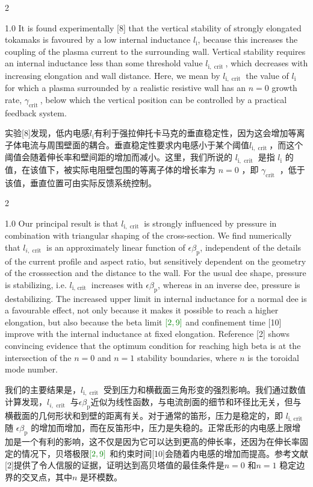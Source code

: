 \documentclass[utf8]{ctexart}
\newcommand\enzhbox[2]{
  	\quad\par \begin{paracol}{2} \colseprulecolor{black} 
  		\begin{spacing}{1.0}
  			\footnotesize  #1
  		\end{spacing}
  		\switchcolumn[1] 
  		#2
  	\end{paracol} \quad\par
  }
\begin{document}
\begin{sloppypar}
 
\enzhbox{  It is found experimentally \textcolor{green!50!black}{[8]} that the vertical stability of strongly elongated tokamaks is favoured by a low internal inductance $l_{\mathrm{i}}$, because this increases the coupling of the plasma current to the surrounding wall. Vertical stability requires an internal inductance less than some threshold value $l_{\mathrm{i}, \text { crit }}$, which decreases with increasing elongation and wall distance. Here, we mean by $l_{\mathrm{i}, \text { crit }}$ the value of $l_{\mathrm{i}}$ for which a plasma surrounded by a realistic resistive wall has an $n=0$ growth rate, $\gamma_{\text {crit }}$, below which the vertical position can be controlled by a practical feedback system.}{
实验\textcolor{green!50!black}{[8]}发现，低内电感$l_{\mathrm{i}}$有利于强拉伸托卡马克的垂直稳定性，因为这会增加等离子体电流与周围壁面的耦合。垂直稳定性要求内电感小于某个阈值$l_{\mathrm{i}, \text { crit }}$，而这个阈值会随着伸长率和壁间距的增加而减小。这里，我们所说的 $l_{\mathrm{i}, \text { crit }}$ 是指 $l_{\mathrm{i}}$ 的值，在该值下，被实际电阻壁包围的等离子体的增长率为 $n=0$  ，即 $\gamma_{\text {crit }}$ ，低于该值，垂直位置可由实际反馈系统控制。}
  
  
 
\enzhbox{  Our principal result is that $l_{\mathrm{i}, \text { crit }}$ is strongly influenced by pressure in combination with triangular shaping of the cross-section. We find numerically that $l_{i, \text { crit }}$ is an approximately linear function of $\epsilon \beta_{\mathrm{p}}$, independent of the details of the current profile and aspect ratio, but sensitively dependent on the geometry of the crosssection and the distance to the wall. For the usual dee shape, pressure is stabilizing, i.e. $l_{\mathrm{i} \text {, crit }}$ increases with $\epsilon \beta_{\mathrm{p}}$, whereas in an inverse dee, pressure is destabilizing. The increased upper limit in internal inductance for a normal dee is a favourable effect, not only because it makes it possible to reach a higher elongation, but also because the beta limit $\textcolor{green!50!black}{[2,9]}$ and confinement time \textcolor{green!50!black}{[10]} improve with the internal inductance at fixed elongation. Reference \textcolor{green!50!black}{[2]} shows convincing evidence that the optimum condition for reaching high beta is at the intersection of the $n=0$ and $n=1$ stability boundaries, where $n$ is the toroidal mode number.}{
我们的主要结果是，$l_{\mathrm{i}, \text { crit }}$  受到压力和横截面三角形变的强烈影响。我们通过数值计算发现，$l_{i, \text { crit }}$ 与$\epsilon \beta_{\mathrm{p}}$近似为线性函数，与电流剖面的细节和环径比无关，但与横截面的几何形状和到壁的距离有关。对于通常的笛形，压力是稳定的，即 $l_{\mathrm{i} \text {, crit }}$  随 $\epsilon \beta_{\mathrm{p}}$ 的增加而增加，而在反笛形中，压力是失稳的。正常氐形的内电感上限增加是一个有利的影响，这不仅是因为它可以达到更高的伸长率，还因为在伸长率固定的情况下，贝塔极限$\textcolor{green!50!black}{[2,9]}$ 和约束时间\textcolor{green!50!black}{[10]}会随着内电感的增加而提高。参考文献\textcolor{green!50!black}{[2]}提供了令人信服的证据，证明达到高贝塔值的最佳条件是$n=0$ 和$n=1$ 稳定边界的交叉点，其中$n$ 是环模数。}
  

\end{sloppypar}
\end{document}

